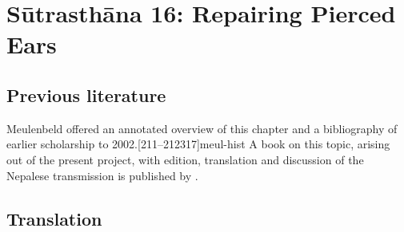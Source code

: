 
\chapter{Sūtrasthāna 16: Repairing Pierced Ears}


\section{Previous literature}

Meulenbeld offered an annotated overview of this chapter and a
bibliography of earlier scholarship to
2002.[211--212317]{meul-hist}  A book on this topic, arising
out of the present project, with edition, translation and discussion of
the Nepalese transmission is published by \cite{wuja-2023}.


\section{Translation}

